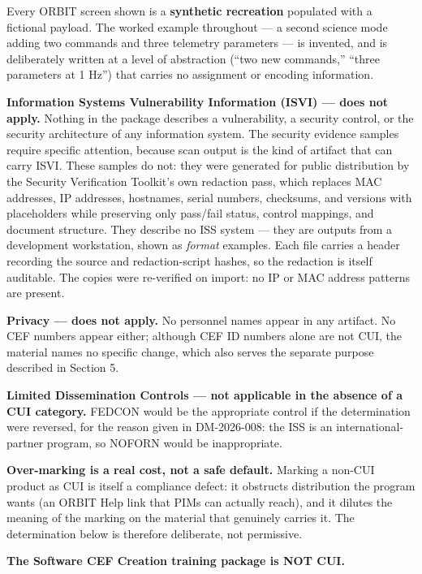 {\begin{enumerate}
Every ORBIT screen shown is a \textbf{synthetic recreation} populated with a fictional payload. The worked example throughout --- a second science mode adding two commands and three telemetry parameters --- is invented, and is deliberately written at a level of abstraction (``two new commands,'' ``three parameters at 1 Hz'') that carries no assignment or encoding information.

\textbf{Information Systems Vulnerability Information (ISVI) --- does not apply.} Nothing in the package describes a vulnerability, a security control, or the security architecture of any information system. The security evidence samples require specific attention, because scan output is the kind of artifact that can carry ISVI. These samples do not: they were generated for public distribution by the Security Verification Toolkit's own redaction pass, which replaces MAC addresses, IP addresses, hostnames, serial numbers, checksums, and versions with placeholders while preserving only pass/fail status, control mappings, and document structure. They describe no ISS system --- they are outputs from a development workstation, shown as \textit{format} examples. Each file carries a header recording the source and redaction-script hashes, so the redaction is itself auditable. The copies were re-verified on import: no IP or MAC address patterns are present.

\textbf{Privacy --- does not apply.} No personnel names appear in any artifact. No CEF numbers appear either; although CEF ID numbers alone are not CUI, the material names no specific change, which also serves the separate purpose described in Section 5.

\textbf{Limited Dissemination Controls --- not applicable in the absence of a CUI category.} FEDCON would be the appropriate control if the determination were reversed, for the reason given in DM-2026-008: the ISS is an international-partner program, so NOFORN would be inappropriate.

\textbf{Over-marking is a real cost, not a safe default.} Marking a non-CUI product as CUI is itself a compliance defect: it obstructs distribution the program wants (an ORBIT Help link that PIMs can actually reach), and it dilutes the meaning of the marking on the material that genuinely carries it. The determination below is therefore deliberate, not permissive.


\textbf{The Software CEF Creation training package is NOT CUI.}


\end{enumerate}}
